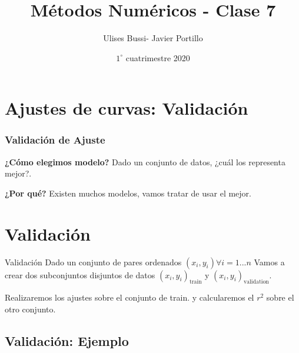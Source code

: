\documentclass[xcolor=svgnames]{beamer} %
\title{Métodos Numéricos - Clase 7}
\author{Ulises Bussi- Javier Portillo}
\date{ $1^\circ$ cuatrimestre 2020}
\theoremstyle{plain}
\renewcommand{\textbf}[1]{{\bfseries\textcolor{redUnq2}{#1}}}
\theoremstyle{definition}
\begin{document}
 


\begin{frame} %
	\titlepage
\end{frame}

\begin{frame}
\tableofcontents
\end{frame}


\section{Ajustes de curvas: Validación}

\begin{frame}
\frametitle{Validación de Ajuste}

\vspace{10pt}


\begin{tcolorbox}
\textbf{¿Cómo elegimos modelo?}
Dado un conjunto de datos, ¿cuál los representa mejor?.
\end{tcolorbox} \vspace{20pt}

\textbf{¿Por qué?}
\pause
Existen muchos modelos, vamos tratar de usar el mejor.


\end{frame}

\section{Validación}

\begin{frame}{Validación}
 Dado un conjunto de pares ordenados $(x_i,y_i) \forall i=1...n$ Vamos a crear dos subconjuntos disjuntos de datos $(x_i,y_i)_{\text{train}}$ y $(x_i,y_i)_{\text{validation}}$. \vspace{20pt}
 
 Realizaremos los ajustes sobre el conjunto de train. y calcularemos el $r^2$ sobre el otro conjunto. 
\end{frame}

\subsection{Validación: Ejemplo}
\end{document}
